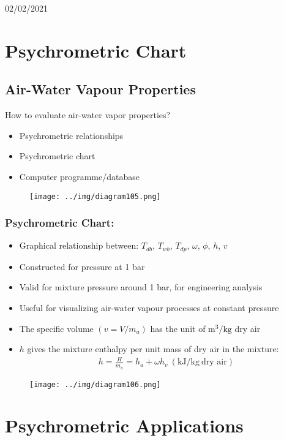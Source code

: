 \documentclass[class=report, crop=false, 12pt,a4paper]{standalone}
\numberwithin{equation}{section}
\begin{document}
\begin{center}
  02/02/2021
\end{center}
\section{Psychrometric Chart}
\subsection{Air-Water Vapour Properties}
How to evaluate air-water vapor properties?
\begin{itemize}[noitemsep]
  \item Psychrometric relationships
  \item Psychrometric chart
  \item Computer programme/database
\end{itemize}
\begin{figure}[H]
  \centering
  \texttt{[image: ../img/diagram105.png]}
  \caption{}
\end{figure}
\subsubsection{Psychrometric Chart:}
\begin{itemize}[noitemsep]
  \item Graphical relationship between: $T_{db}$, $T_{wb}$, $T_{dp}$, $\omega$, $\phi$, $h$, $v$
  \item Constructed for pressure at 1 bar
  \item Valid for mixture pressure around 1 bar, for engineering analysis
  \item Useful for visualizing air-water vapour processes at constant pressure
  \item The specific volume $(v=V/m_a)$ has the unit of $\si{\metre\cubed\per\kilogram}$ dry air
  \item $h$ gives the mixture enthalpy per unit mass of dry air in the mixture:
  \begin{gather}
    h = \frac{H}{m_a} = h_a + \omega h_v \ (\si{\kilo\joule\per\kilogram} \ \text{dry air})
  \end{gather}
\end{itemize}
\begin{figure}[H]
  \centering
  \texttt{[image: ../img/diagram106.png]}
  \caption{}
\end{figure}
\section{Psychrometric Applications}
\end{document}
